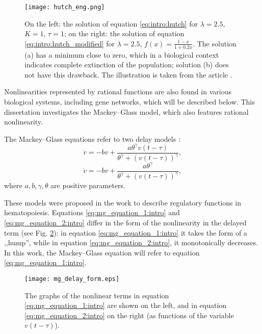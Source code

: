 	
\begin{figure}
	\centering
	\texttt{[image: hutch\_eng.png]}
	\caption{On the left: the solution of equation \eqref{eq:intro:hutch} for $\lambda = 2.5$, $K = 1$, $\tau = 1$; on the right: the solution of equation \eqref{eq:intro:hutch_modified} for $\lambda = 2.5$, $f(x) = \frac{1 - x}{1 + 0.2x}$. The solution (a) has a minimum close to zero, which in a biological context indicates complete extinction of the population; solution (b) does not have this drawback. The illustration is taken from the article \cite{Kolesov2010}.}
	\label{fig:intro:hutch}
\end{figure}

Nonlinearities represented by rational functions are also found in various biological systems, including gene networks, which will be described below. This dissertation investigates the Mackey--Glass model, which also features rational nonlinearity.

The Mackey--Glass equations refer to two delay models \cite{Mackey1977, Glass1988}:
\begin{equation}
	\label{eq:mg_equation_1:intro}
	\dot{v}=-b v+\frac{a \theta^{\gamma} v(t-\tau)}{\theta^{\gamma}+(v(t-\tau))^{\gamma}},
\end{equation}
\begin{equation}
	\label{eq:mg_equation_2:intro}
	\dot{v}=-b v+\frac{a \theta^{\gamma}}{\theta^{\gamma}+(v(t-\tau))^{\gamma}},
\end{equation}
where $a, b, \gamma, \theta$ are positive parameters.

These models were proposed in the work \cite{Mackey1977} to describe regulatory functions in hematopoiesis. Equations \eqref{eq:mg_equation_1:intro} and \eqref{eq:mg_equation_2:intro} differ in the form of the nonlinearity in the delayed term (see Fig. \ref{fig:mg_delay_form}): in equation \eqref{eq:mg_equation_1:intro} it takes the form of a ,,hump'', while in equation \eqref{eq:mg_equation_2:intro}, it monotonically decreases. In this work, the Mackey--Glass equation will refer to equation \eqref{eq:mg_equation_1:intro}.

\begin{figure}
	\centering
	\texttt{[image: mg\_delay\_form.eps]}
	\caption{The graphs of the nonlinear terms in equation \eqref{eq:mg_equation_1:intro} are shown on the left, and in equation \eqref{eq:mg_equation_2:intro} on the right (as functions of the variable $v(t - \tau)$).
	}
	\label{fig:mg_delay_form}
\end{figure}

